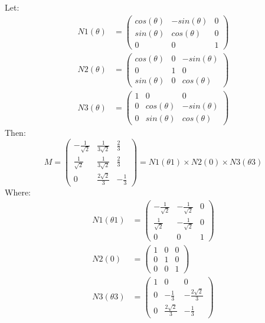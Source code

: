 \documentclass[10pt]{article}
\begin{document}
Let:
\begin{align*}
N1(\theta) &= 
\left(
\begin{array}{ccc}
 cos(\theta) & -sin(\theta) & 0 \\
 sin(\theta) &  cos(\theta) & 0 \\
 0           & 0            & 1
\end{array}
\right) \\
N2(\theta) &= 
\left(
\begin{array}{ccc}
 cos(\theta) & 0 & -sin(\theta) \\
 0           & 1 & 0            \\
 sin(\theta) & 0 &  cos(\theta)
\end{array}
\right) \\
N3(\theta) &= 
\left(
\begin{array}{ccc}
 1 & 0           & 0            \\
 0 & cos(\theta) & -sin(\theta) \\
 0 & sin(\theta) &  cos(\theta)
\end{array}
\right)
\end{align*}
Then:
\begin{equation*}
M = 
\left(
\begin{array}{ccc}
 -\frac{1}{\sqrt{2}} & \frac{1}{3 \sqrt{2}} & \frac{2}{3} \\[0.07in]
 \frac{1}{\sqrt{2}} & \frac{1}{3 \sqrt{2}} & \frac{2}{3} \\[0.07in]
 0 & \frac{2 \sqrt{2}}{3} & -\frac{1}{3}
\end{array}
\right)
= N1(\theta 1) \times N2(0) \times N3(\theta 3)
\end{equation*}
Where:
\begin{align*}
N1(\theta 1) &=
\left(
\begin{array}{ccc}
 -\frac{1}{\sqrt{2}} & -\frac{1}{\sqrt{2}} & 0 \\[0.07in]
 \frac{1}{\sqrt{2}} & -\frac{1}{\sqrt{2}} & 0 \\[0.05in]
 0 & 0 & 1
\end{array}
\right) \\
N2(0) &=
\left(
\begin{array}{ccc}
 1 & 0 & 0 \\
 0 & 1 & 0 \\
 0 & 0 & 1
\end{array}
\right) \\
N3(\theta 3) &=
\left(
\begin{array}{ccc}
 1 & 0 & 0 \\
 0 & -\frac{1}{3} & -\frac{2 \sqrt{2}}{3} \\[0.07in]
 0 & \frac{2 \sqrt{2}}{3} & -\frac{1}{3}
\end{array}
\right)
\end{align*}
\end{document}

